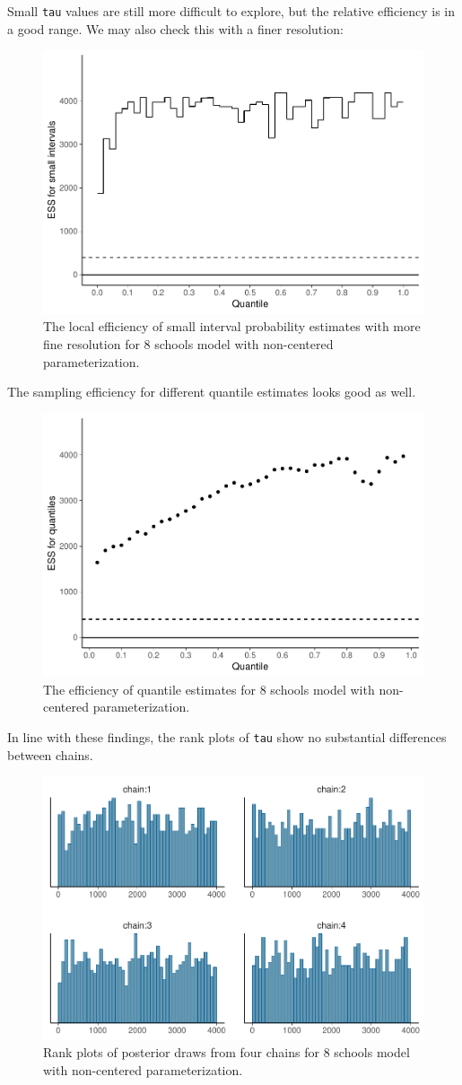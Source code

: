 \documentclass[american,]{article}
\begin{document}
Small \texttt{tau} values are still more difficult to explore, but the
relative efficiency is in a good range. We may also check this with a
finer resolution:

\begin{figure}[t]
  \centering
  \includegraphics[width=0.6\linewidth]{graphics/local-ess-fit-ncp2-finer-1.pdf}
  \caption{The local efficiency of small interval probability estimates with more fine resolution for 8 schools model with non-centered parameterization.}
\end{figure}

The sampling efficiency for different quantile estimates looks good as
well.

\begin{figure}[t]
  \centering
  \includegraphics[width=0.6\linewidth]{graphics/quantile-ess-fit-ncp2-1.pdf}
  \caption{The efficiency of quantile estimates for 8 schools model with non-centered parameterization.}
\end{figure}

In line with these findings, the rank plots of \texttt{tau} show no
substantial differences between chains.

\begin{figure}[t]
  \centering
  \includegraphics[width=0.6\linewidth]{graphics/hist-fit-ncp2-1.pdf}
  \caption{Rank plots of posterior draws from four chains for 8 schools model with non-centered parameterization.}
\end{figure}
\end{document}
